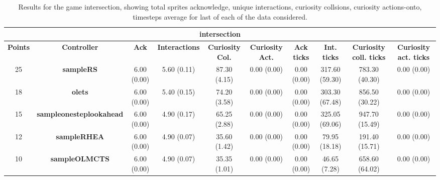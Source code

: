 \begin{table*}[!t]
\begin{center}
\begin{adjustbox}{width=1\textwidth}
\begin{tabular}{|c|c|c|c|c|c|c|c|c|c|}
\multicolumn{10}{c}{\textbf{intersection}}\\
\hline
\textbf{Points} & \textbf{Controller} & \textbf{Ack} & \textbf{Interactions} & \textbf{Curiosity Col.} & \textbf{Curiosity Act.} & \textbf{Ack ticks} & \textbf{Int. ticks} & \textbf{Curiosity coll. ticks} & \textbf{Curiosity act. ticks}\\
\hline
25 & \textbf{sampleRS} & 6.00 (0.00) & 5.60 (0.11) & 87.30 (4.15) & 0.00 (0.00) & 0.00 (0.00) & 317.60 (59.30) & 783.30 (40.30) & 0.00 (0.00)
 \\
\hline
18 & \textbf{olets} & 6.00 (0.00) & 5.40 (0.15) & 74.20 (3.58) & 0.00 (0.00) & 0.00 (0.00) & 303.30 (67.48) & 856.50 (30.22) & 0.00 (0.00)
 \\
\hline
15 & \textbf{sampleonesteplookahead} & 6.00 (0.00) & 4.90 (0.17) & 65.25 (2.88) & 0.00 (0.00) & 0.00 (0.00) & 325.05 (69.06) & 947.70 (15.49) & 0.00 (0.00)
 \\
\hline
12 & \textbf{sampleRHEA} & 6.00 (0.00) & 4.90 (0.07) & 35.60 (1.42) & 0.00 (0.00) & 0.00 (0.00) & 79.95 (18.18) & 191.40 (15.71) & 0.00 (0.00)
 \\
\hline
10 & \textbf{sampleOLMCTS} & 6.00 (0.00) & 4.90 (0.07) & 35.35 (1.01) & 0.00 (0.00) & 0.00 (0.00) & 46.65 (7.28) & 658.60 (64.02) & 0.00 (0.00)
 \\
\hline
\end{tabular}
\end{adjustbox}
\caption{Results for the game intersection, showing total sprites acknowledge, unique interactions, curiosity collsions, curiosity actions-onto, timesteps average for last of each of the data considered.}
\label{tab:weights}
\end{center}
\end{table*}
